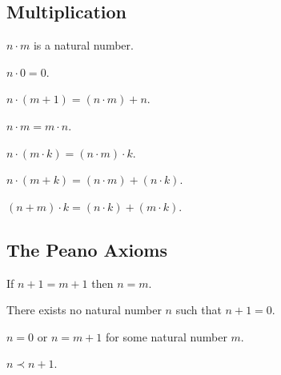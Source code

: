 \documentclass[english]{article}
\begin{document}
\subsection{Multiplication}

\begin{forthel}
  \begin{signature}
    $n \cdot m$ is a natural number.
  \end{signature}

  \begin{axiom}
    $n \cdot 0 = 0$.
  \end{axiom}

  \begin{axiom}
    $n \cdot (m + 1) = (n \cdot m) + n$.
  \end{axiom}

  \begin{axiom}
    $n \cdot m = m \cdot n$.
  \end{axiom}

  \begin{axiom}
    $n \cdot (m \cdot k) = (n \cdot m) \cdot k$.
  \end{axiom}

  \begin{axiom}
    $n \cdot (m + k) = (n \cdot m) + (n \cdot k)$.
  \end{axiom}

  \begin{axiom}
    $(n + m) \cdot k = (n \cdot k) + (m \cdot k)$.
  \end{axiom}
\end{forthel}


\subsection{The Peano Axioms}

\begin{forthel}
  \begin{axiom}
    If $n + 1 =  m + 1$ then $n = m$.
  \end{axiom}

  \begin{axiom}
    There exists no natural number $n$ such that $n + 1 = 0$.
  \end{axiom}

  \begin{axiom}
    $n = 0$ or $n = m + 1$ for some natural number $m$.
  \end{axiom}

  \begin{axiom}
    $n \prec n + 1$.
  \end{axiom}
\end{forthel}
\end{document}
